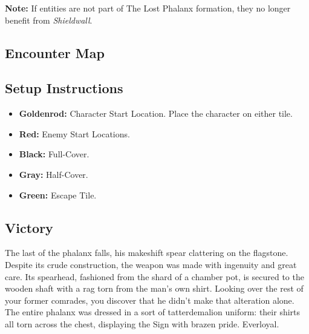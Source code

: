 \begin{tcolorbox}
\textbf{Note:} If entities are not part of The Lost Phalanx formation, they no longer benefit from \emph{Shieldwall}.
\end{tcolorbox}

\pagebreak

\subsection*{Encounter Map}
\begin{center}
\end{center}

\subsection*{Setup Instructions}
\begin{itemize}
\item \textbf{Goldenrod:} Character Start Location. Place the character on either tile.
\item \textbf{Red:} Enemy Start Locations.
\item \textbf{Black:} Full-Cover.
\item \textbf{Gray:} Half-Cover.
\item \textbf{Green:} Escape Tile.
\end{itemize}

\pagebreak

\subsection*{Victory}
The last of the phalanx falls, his makeshift spear clattering on the flagstone. Despite its crude construction, the weapon was made with ingenuity and great care. Its spearhead, fashioned from the shard of a chamber pot, is secured to the wooden shaft with a rag torn from the man’s own shirt. Looking over the rest of your former comrades, you discover that he didn’t make that alteration alone. The entire phalanx was dressed in a sort of tatterdemalion uniform: their shirts all torn across the chest, displaying the Sign with brazen pride. Everloyal.\\

